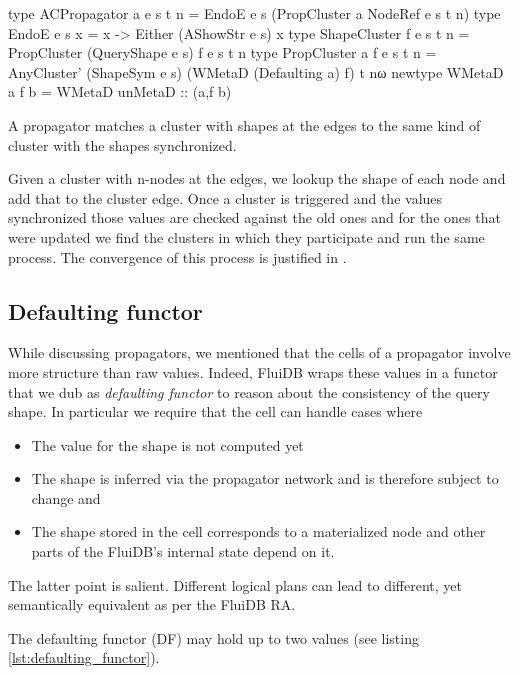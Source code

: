 \begin{code}
  \begin{haskellcode}
    type ACPropagator a e s t n =
      EndoE e s (PropCluster a NodeRef e s t n)
    type EndoE e s x = x -> Either (AShowStr e s) x
    type ShapeCluster f e s t n = PropCluster (QueryShape e s) f e s t n
    type PropCluster a f e s t n =
      AnyCluster' (ShapeSym e s) (WMetaD (Defaulting a) f) t nω
    newtype WMetaD a f b = WMetaD { unMetaD :: (a,f b)}
  \end{haskellcode}
  \caption{\label{lst:acpropagator}A propagator matches a cluster with
    shapes at the edges to the same kind of cluster with the shapes
    synchronized.}
\end{code}

Given a cluster with n-nodes at the edges, we lookup the shape of each
node and add that to the cluster edge.
Once a cluster is triggered and the values synchronized those values
are checked against the old ones and for the ones that were updated we
find the clusters in which they participate and run the same
process. The convergence of this process is justified in \cite{kuperLVarsLatticebasedData2013}.

\subsection{Defaulting functor}

While discussing propagators, we mentioned that the cells of a
propagator involve more structure than raw values. Indeed, FluiDB
wraps these values in a functor that we dub as \emph{defaulting
  functor} to reason about the consistency of the query shape. In
particular we require that the cell can handle cases where 
\begin{itemize}
\item The value for the shape is not computed yet
\item The shape is inferred via the propagator network and is therefore subject to change and
\item The shape stored in the cell corresponds to a materialized node and other
parts of the FluiDB's internal state depend on it.
\end{itemize}

The latter point is salient. Different logical plans can lead to different, yet
semantically equivalent as per the FluiDB RA.

The defaulting functor (DF) may hold up to two values (see listing
\ref{lst:defaulting_functor}).

